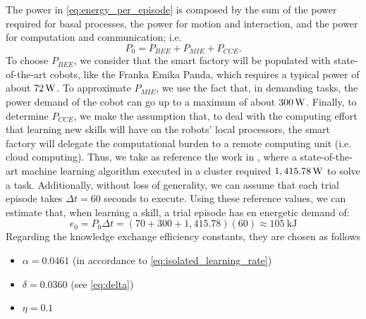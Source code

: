 The power in \eqref{eq:energy_per_episode} is composed by the sum of the power required for basal processes, the power for motion and interaction, and the power for computation and communication; i.e.
\begin{equation}
    P_0 = P_{BEE}+P_{MIE} + P_{CCE}.
\end{equation}
To choose $P_{BEE}$, we consider that the smart factory will be populated with state-of-the-art cobots, like the Franka Emika Panda, which requires a typical power of about $\unit[72]{W}$. To approximate $P_{MIE}$, we use the fact that, in demanding tasks, the power demand of the cobot can go up to a maximum of about $ \unit[300] {W} $. Finally, to determine $P_{CCE}$, we make the assumption that, to deal with the computing effort that learning new skills will have on the robots' local processors, the smart factory will delegate the computational burden to a remote computing unit (i.e. cloud computing). Thus, we take as reference the work in \cite{Strubell2019EnergyAP}, where a state-of-the-art machine learning algorithm executed in a cluster required $\unit[1,415.78]{W}$ to solve a task. Additionally, without loss of generality, we can assume that each trial episode takes $\Delta t = 60$ seconds to execute. Using these reference values, we can estimate that, when learning a skill, a trial episode has en energetic demand of:
\begin{equation}
	e_0 = P_0 \Delta t = \left(70 + 300 + 1,415.78\right) \left(60\right) \approx 105~\text{kJ}
\end{equation}
Regarding the knowledge exchange efficiency constants, they are chosen as follows
\begin{itemize}
	\item $\alpha =  0.0461$ (in accordance to \eqref{eq:isolated_learning_rate})
	\item $\delta =  0.0360$ (see \eqref{eq:delta})
	\item $\eta= 0.1$
\end{itemize} 

